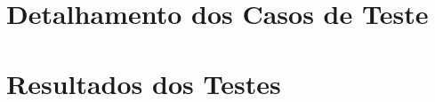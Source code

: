 \documentclass[tcc,baec]{unipampa}
\begin{document}
\chapter{Detalhamento dos Casos de Teste}
\label{appendix-casosTeste}


\chapter{Resultados dos Testes}
\label{appendix-resultadosTestes}




\annex


%
%
\end{document}
